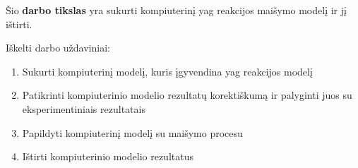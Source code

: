 


Šio \textbf{darbo tikslas} yra sukurti kompiuterinį \acs{yag} reakcijos maišymo modelį ir jį ištirti.

Iškelti darbo uždaviniai:

\begin{enumerate}
\item Sukurti kompiuterinį modelį, kuris įgyvendina \acs{yag} reakcijos modelį
\item Patikrinti kompiuterinio modelio rezultatų korektiškumą ir palyginti juos su eksperimentiniais rezultatais
\item Papildyti kompiuterinį modelį su maišymo procesu
\item Ištirti kompiuterinio modelio rezultatus
\end{enumerate}